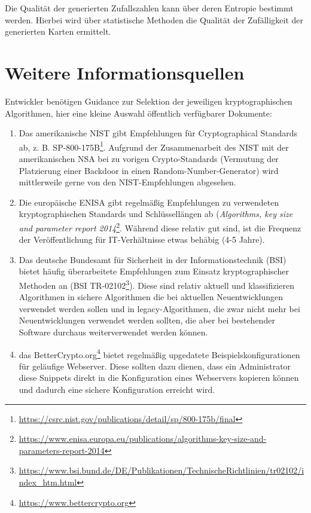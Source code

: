 Die Qualität der generierten Zufallszahlen kann über deren Entropie bestimmt werden. Hierbei wird über statistische Methoden die Qualität der Zufälligkeit der generierten Karten ermittelt.

\section{Weitere Informationsquellen}

Entwickler benötigen Guidance zur Selektion der jeweiligen kryptographischen Algorithmen, hier eine kleine Auswahl öffentlich verfügbarer Dokumente:

\begin{enumerate}
	\item Das amerikanische NIST gibt Empfehlungen für Cryptographical Standards ab, z. B. SP-800-175B\footnote{\url{https://csrc.nist.gov/publications/detail/sp/800-175b/final}}. Aufgrund der Zusammenarbeit des NIST mit der amerikanischen NSA bei zu vorigen Crypto-Standards (Vermutung der Platzierung einer Backdoor in einen Random-Number-Generator) wird mittlerweile gerne von den NIST-Empfehlungen abgesehen.
	\item Die europäische ENISA gibt regelmäßig Empfehlungen zu verwendeten kryptographischen Standards und Schlüssellängen ab (\textit{Algorithms, key size and parameter report 2014}\footnote{\url{https://www.enisa.europa.eu/publications/algorithms-key-size-and-parameters-report-2014}}. Während diese relativ gut sind, ist die Frequenz der Veröffentlichung für IT-Verhältnisse etwas behäbig (4-5 Jahre).
	\item Das deutsche Bundesamt für Sicherheit in der Informationstechnik (BSI) bietet häufig überarbeitete Empfehlungen zum Einsatz kryptographischer Methoden an (BSI TR-02102\footnote{\url{https://www.bsi.bund.de/DE/Publikationen/TechnischeRichtlinien/tr02102/index_htm.html}}). Diese sind relativ aktuell und klassifizieren Algorithmen in sichere Algorithmen die bei aktuellen Neuentwicklungen verwendet werden sollen und in legacy-Algorithmen, die zwar nicht mehr bei Neuentwicklungen verwendet werden sollten, die aber bei bestehender Software durchaus weiterverwendet werden können.
	\item das BetterCrypto.org\footnote{\url{https://www.bettercrypto.org}} bietet regelmäßig upgedatete Beispielskonfigurationen für geläufige Webserver. Diese sollten dazu dienen, dass ein Administrator diese Snippets direkt in die Konfiguration eines Webservers kopieren können und dadurch eine sichere Konfiguration erreicht wird.
\end{enumerate}


